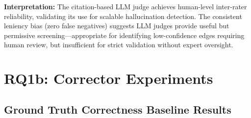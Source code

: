 \documentclass{article}
\begin{document}
\textbf{Interpretation:} The citation-based LLM judge achieves human-level inter-rater reliability, validating its use for scalable hallucination detection. The consistent leniency bias (zero false negatives) suggests LLM judges provide useful but permissive screening---appropriate for identifying low-confidence edges requiring human review, but insufficient for strict validation without expert oversight.

\section{RQ1b: Corrector Experiments}

\subsection{Ground Truth Correctness Baseline Results}
\end{document}
